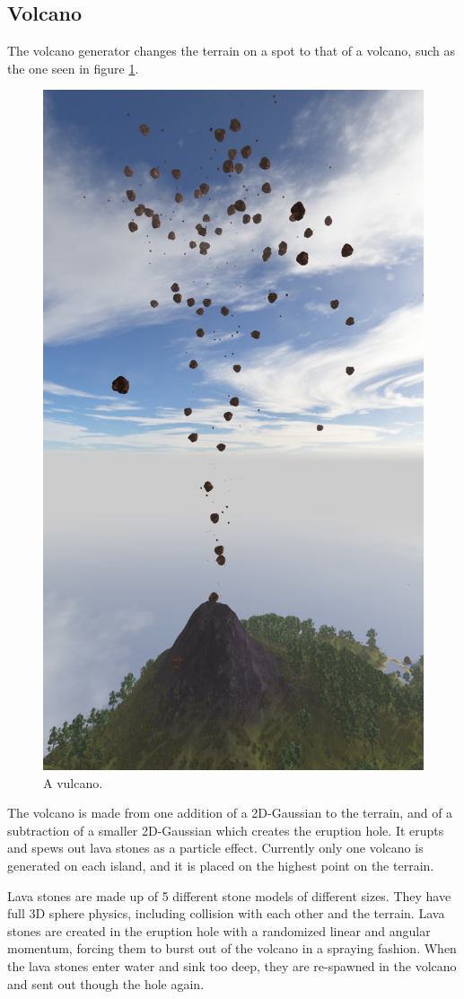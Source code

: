 \subsection{Volcano}
The volcano generator changes the terrain on a spot to that of a volcano, such as the one seen in figure \ref{fig:volcano1}.
\begin{figure}[H]
  \centering
  \includegraphics[width=0.7\linewidth]{images/volcano.jpg}
  \caption{A vulcano.}
  \label{fig:volcano1}
\end{figure}%
\newpage
The volcano is made from one addition of a 2D-Gaussian to the terrain, and of a subtraction of a smaller 2D-Gaussian which creates the eruption hole. It erupts and spews out lava stones as a particle effect. Currently only one volcano is generated on each island, and it is placed on the highest point on the terrain.

Lava stones are made up of 5 different stone models of different sizes. They have full 3D sphere physics, including collision with each other and the terrain. Lava stones are created in the eruption hole with a randomized linear and angular momentum, forcing them to burst out of the volcano in a spraying fashion. When the lava stones enter water and sink too deep, they are re-spawned in the volcano and sent out though the hole again.

